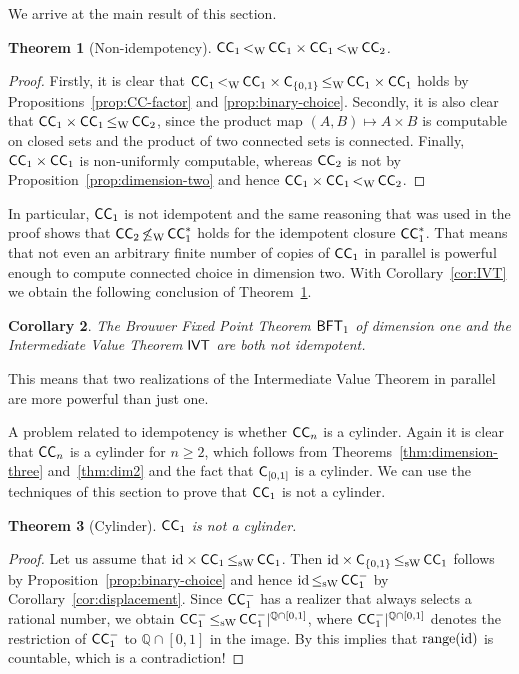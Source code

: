 \documentclass[a4paper]{amsart}
\def\IQ{{\mathbb{Q}}}
\def\id{{\rm id}}
\def\range{{\rm range}}
\def\IVT{\text{\rm\sffamily IVT}}
\def\BFT{\mbox{\rm\sffamily BFT}}
\def\C{\mbox{\rm\sffamily C}}
\def\ConC{\mbox{\rm\sffamily CC}}
\def\leqW{\mathop{\leq_{\mathrm{W}}}}
\def\leqSW{\mathop{\leq_{\mathrm{sW}}}}
\def\nleqW{\mathop{\not\leq_{\mathrm{W}}}}
\def\lW{\mathop{<_{\mathrm{W}}}}
\newtheorem{theorem}{Theorem}[section]
\newtheorem{corollary}[theorem]{Corollary}
\theoremstyle{definition}
\begin{document}
We arrive at the main result of this section.

\begin{theorem}[Non-idempotency]
\label{thm:idempotency}
$\ConC_1\lW\ConC_1\times\ConC_1\lW\ConC_2$.
\end{theorem}
\begin{proof}
Firstly, it is clear that $\ConC_1\lW\ConC_1\times\C_{\{0,1\}}\leqW\ConC_1\times\ConC_1$ holds
by Propositions~\ref{prop:CC-factor} and \ref{prop:binary-choice}.  
Secondly, it is also clear that $\ConC_1\times\ConC_1\leqW\ConC_2$, since
the product map $(A,B)\mapsto A\times B$ is computable on closed sets and
the product of two connected sets is connected. 
Finally, $\ConC_1\times\ConC_1$ is non-uniformly computable,
whereas $\ConC_2$ is not by Proposition~\ref{prop:dimension-two} and hence $\ConC_1\times\ConC_1\lW\ConC_2$. 
\end{proof}

In particular, $\ConC_1$ is not idempotent and the same reasoning that was used in the proof 
shows that $\ConC_2\nleqW\ConC_1^*$ holds for the idempotent closure $\ConC_1^*$.
That means that not even an arbitrary finite number of copies of $\ConC_1$ in parallel is powerful
enough to compute connected choice in dimension two.
With Corollary~\ref{cor:IVT} we obtain the following conclusion of Theorem~\ref{thm:idempotency}.

\begin{corollary}
The Brouwer Fixed Point Theorem $\BFT_1$ of dimension one and 
the Intermediate Value Theorem $\IVT$ are both not idempotent.
\end{corollary}

This means that two realizations of the Intermediate Value Theorem in parallel are more
powerful than just one. 

A problem related to idempotency is whether $\ConC_n$ is a cylinder. Again it is clear that
$\ConC_n$ is a cylinder for $n\geq 2$, which follows from Theorems~\ref{thm:dimension-three}
and~\ref{thm:dim2} and the fact that $\C_{[0,1]}$ is a cylinder. 
We can use the techniques of this section to prove that $\ConC_1$ is not a cylinder.

\begin{theorem}[Cylinder] $\ConC_1$ is not a cylinder.
\end{theorem}
\begin{proof}
Let us assume that $\id\times\ConC_1\leqSW\ConC_1$. Then $\id\times\C_{\{0,1\}}\leqSW\ConC_1$ follows 
by Proposition~\ref{prop:binary-choice} and hence $\id\leqSW\ConC_1^-$ by Corollary~\ref{cor:displacement}.
Since $\ConC_1^-$ has a realizer that always selects a rational number, we obtain $\ConC_1^-\leqSW\ConC_1^-|^{\IQ\cap[0,1]}$,
where $\ConC_1^-|^{\IQ\cap[0,1]}$ denotes the restriction of $\ConC_1^-$ to $\IQ\cap[0,1]$ in the image.
By \cite[Proposition~13.2]{BGM12} this implies that $\range(\id)$ is countable, which is a contradiction!
\end{proof}
\end{document}

